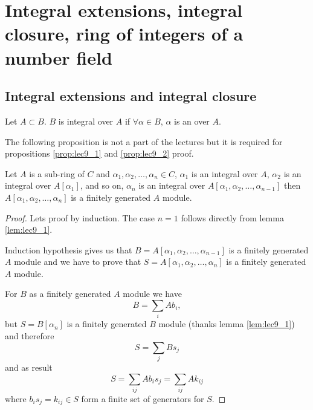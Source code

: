 \section{Integral extensions, integral closure, ring of integers of a
  number field}

\subsection{Integral extensions and integral closure}

\begin{definition}
  Let $A \subset B$. $B$ is integral over $A$ if $\forall \alpha \in
  B$, $\alpha$ is an  over $A$.  
  \label{def:integralextension}
\end{definition}

The following proposition is not a part of the lectures but it is
required for propositions \ref{prop:lec9_1} and \ref{prop:lec9_2}
proof.
\begin{proposition}
  Let $A$ is a sub-ring of $C$ and
  $\alpha_1, \alpha_2, \dots, \alpha_n \in C$,
  $\alpha_1$ is an integral over $A$,
  $\alpha_2$ is an integral over $A\left[\alpha_1\right]$, and so on,
  $\alpha_n$  is an integral over
  $A\left[\alpha_1, \alpha_2, \dots,   \alpha_{n-1}\right]$ then
  $A\left[\alpha_1, \alpha_2, \dots,\alpha_{n}\right]$ is a finitely
  generated $A$ module.
  \begin{proof}
    Lets proof by induction. The case $n=1$ follows directly from
    lemma \ref{lem:lec9_1}.

    Induction hypothesis gives us that
    $B = A\left[\alpha_1, \alpha_2, \dots,\alpha_{n-1}\right]$ is a finitely
    generated $A$ module and we have to prove that
    $S = A\left[\alpha_1, \alpha_2, \dots, \alpha_{n}\right]$ is a finitely
    generated $A$ module.

    For $B$ as a finitely generated $A$ module we have
    \[
    B = \sum_i A b_i,
    \]
    but $S = B\left[\alpha_n\right]$ is a finitely generated $B$
    module (thanks lemma \ref{lem:lec9_1}) and therefore
    \[
    S = \sum_j B s_j
    \]
    and as result
    \[
    S = \sum_{ij} A b_i s_j =
    \sum_{ij} A k_{ij}
    \]
    where $b_i s_j = k_{ij} \in S$ form a finite set of generators for $S$.
  \end{proof}
  \label{prop:lec9_add}
\end{proposition}

